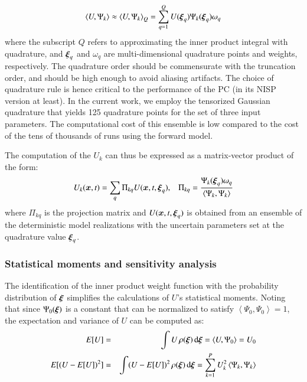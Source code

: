 \begin{equation}
  \left< U, \Psi_k \right> 
\approx \left< U, \Psi_k \right>_Q
= \sum_{q=1}^Q U(\xxi_q) \Psi_k(\xxi_q) \omega_q
\end{equation}
where the subscript $Q$ refers to approximating the inner product integral with
quadrature, and $\xxi_q$ and $\omega_q$ are multi-dimensional quadrature points and weights,
respectively. The quadrature order should be commensurate with the
truncation order, and should be high enough to avoid aliasing artifacts.
The choice of quadrature rule is hence critical to the performance
of the PC (in its NISP version at least). In the current work, we employ the 
tensorized Gaussian quadrature that yields 125 quadrature points for the set of three input parameters.
The computational cost of this ensemble is low compared to the cost of the 
tens of thousands of runs using the forward model.

The computation of the ${U}_k$ can thus be expressed as a matrix-vector product of the form:
\begin{equation} 
 U_k(\bm{x},t)=\sum_q \Pi_{kq} U(\bm{x},t,\xxi_q),\;\;\;
 \Pi_{kq}=\frac{\Psi_k(\xxi_q)\omega_q}{\left< \Psi_k, \Psi_k \right>}
\end{equation} 
where $\Pi_{kq}$ is the projection matrix and $U(\bm{x},t,\xxi_q)$ is obtained
from an ensemble of the deterministic model realizations with the uncertain parameters set at
the quadrature value $\xxi_q$. 


\subsubsection{Statistical moments and sensitivity analysis}
The identification of the inner product weight function
with the probability distribution of $\xxi$ simplifies the calculations of $U$'s statistical moments. 
Noting that since $\Psi_0(\xxi)$ is a constant that can be normalized to satisfy 
$\left<\Psi_0,\Psi_0\right>=1$, the expectation and variance of $U$ can be computed as:
\begin{eqnarray}
 E[U]&=&\int U \, \rho(\xxi) \, \mbox{d}\xxi=\left< U,\Psi_0\right> = U_0  
 \label{eq:mean} \\
 E[(U-E[U])^2]&=&\int (U-E[U])^2 \, \rho(\xxi) \, \mbox{d}\xxi=\sum_{k=1}^P U_k^2
 \label{eq:sigma}
\left<\Psi_k,\Psi_k\right>
\end{eqnarray}

